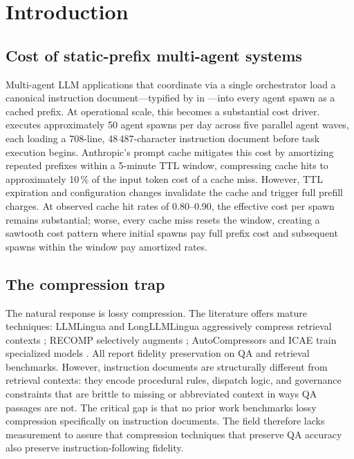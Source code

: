 \section{Introduction}
\label{sec:intro}

\subsection*{Cost of static-prefix multi-agent systems}

Multi-agent LLM applications that coordinate via a single orchestrator
load a canonical instruction document—typified by \claudemd in
\blackrim—into every agent spawn as a cached prefix. At operational
scale, this becomes a substantial cost driver. \blackrim executes
approximately 50 agent spawns per day across five parallel agent waves,
each loading a 708-line, 48\,487-character instruction document before
task execution begins. Anthropic's prompt cache mitigates this cost by
amortizing repeated prefixes within a 5-minute TTL window, compressing
cache hits to approximately 10\,\% of the input token cost of a cache
miss. However, TTL expiration and configuration changes invalidate
the cache and trigger full prefill charges. At observed cache hit rates
of 0.80--0.90, the effective cost per spawn remains substantial; worse,
every cache miss resets the window, creating a sawtooth cost pattern
where initial spawns pay full prefix cost and subsequent spawns within
the window pay amortized rates.

\subsection*{The compression trap}

The natural response is lossy compression. The literature offers mature
techniques: LLMLingua and LongLLMLingua aggressively compress retrieval
contexts \cite{llmlingua,longllmlingua}; RECOMP selectively augments
\cite{recomp}; AutoCompressors and ICAE train specialized models
\cite{autocompressors,icae}. All report fidelity preservation on QA and
retrieval benchmarks. However, instruction documents are structurally
different from retrieval contexts: they encode procedural rules,
dispatch logic, and governance constraints that are brittle to missing or
abbreviated context in ways QA passages are not. The critical gap is
that no prior work benchmarks lossy compression specifically on
instruction documents. The field therefore lacks measurement to assure
that compression techniques that preserve QA accuracy also preserve
instruction-following fidelity.

